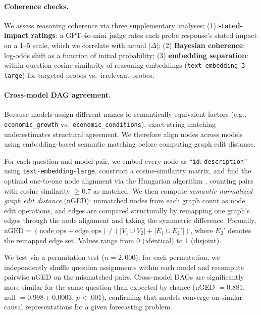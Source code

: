 \documentclass[11pt]{article}
\begin{document}
\paragraph{Coherence checks.}
We assess reasoning coherence via three supplementary analyses: (1) \textbf{stated-impact ratings}: a GPT-4o-mini judge rates each probe response's stated impact on a 1--5 scale, which we correlate with actual $|\Delta|$; (2) \textbf{Bayesian coherence}: log-odds shift as a function of initial probability; (3) \textbf{embedding separation}: within-question cosine similarity of reasoning embeddings (\texttt{text-embedding-3-large}) for targeted probes vs.\ irrelevant probes.

\paragraph{Cross-model DAG agreement.}
Because models assign different names to semantically equivalent factors (e.g., \texttt{economic\_growth} vs.\ \texttt{economic\_conditions}), exact string matching underestimates structural agreement. We therefore align nodes across models using embedding-based semantic matching before computing graph edit distance.

For each question and model pair, we embed every node as ``\texttt{id}: \texttt{description}'' using \texttt{text\allowbreak-embedding\allowbreak-large}, construct a cosine-similarity matrix, and find the optimal one-to-one node alignment via the Hungarian algorithm \citep{kuhn1955hungarian}, counting pairs with cosine similarity $\geq 0.7$ as matched. We then compute \emph{semantic normalized graph edit distance} (nGED): unmatched nodes from each graph count as node edit operations, and edges are compared structurally by remapping one graph's edges through the node alignment and taking the symmetric difference. Formally, $\text{nGED} = (\text{node\_ops} + \text{edge\_ops}) \,/\, (|V_1 \cup V_2| + |E_1 \cup E_2'|)$, where $E_2'$ denotes the remapped edge set. Values range from 0 (identical) to 1 (disjoint).

We test via a permutation test ($n = 2{,}000$): for each permutation, we independently shuffle question assignments within each model and recompute pairwise nGED on the mismatched pairs. Cross-model DAGs are significantly more similar for the same question than expected by chance (nGED $= 0.881$, null $= 0.998 \pm 0.0003$, $p < .001$), confirming that models converge on similar causal representations for a given forecasting problem.
\end{document}
